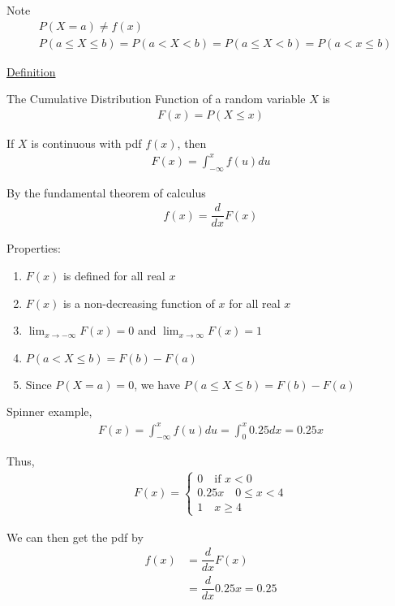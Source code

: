 \documentclass{article}
\begin{document}
Note
\begin{align*}
    &P(X=a) \ne f(x) \\
    &P(a \le X \le b) = P(a < X < b) = P(a \le X < b) = P(a < x \le b)
\end{align*}

\underline{Definition}

The Cumulative Distribution Function of a random variable $X$ is
\begin{align*}
    F(x) = P(X \le x)
\end{align*}

If $X$ is continuous with pdf $f(x)$, then
\begin{align*}
    F(x) = \int_{-\infty}^xf(u)du
\end{align*}

By the fundamental theorem of calculus
\begin{align*}
    f(x) = \dfrac{d}{dx}F(x)
\end{align*}

Properties:
\begin{enumerate}
    \item $F(x)$ is defined for all real $x$
    \item $F(x)$ is a non-decreasing function of $x$ for all real $x$ 
    \item $\lim_{x \to -\infty}F(x) = 0$ and $\lim_{x \to \infty}F(x) = 1$
    \item $P(a < X \le b) = F(b) - F(a)$
    \item Since $P(X = a) = 0$, we have $P(a \le X \le b) = F(b) - F(a)$
\end{enumerate}

Spinner example,
\begin{align*}
    F(x) = \int_{-\infty}^xf(u)du = \int_0^x 0.25dx = 0.25x
\end{align*}

Thus,
\begin{align*}
    F(x) = \begin{cases}
        0 \quad \text{if } x < 0\\
        0.25x \quad 0 \le x < 4 \\
        1 \quad x \ge 4
    \end{cases}
\end{align*}

We can then get the pdf by
\begin{align*}
    f(x) &= \dfrac{d}{dx}F(x) \\
    &= \dfrac{d}{dx}0.25x = 0.25
\end{align*}
\end{document}
